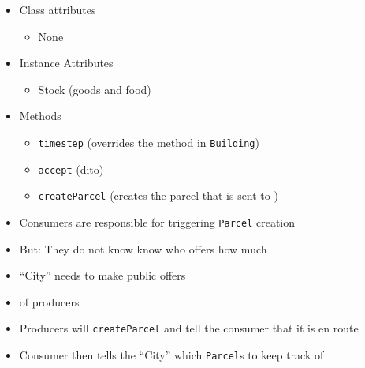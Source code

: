
\begin{frame}
%
\begin{tcbraster}[raster columns=2,
                  raster equal height,
                  nobeforeafter,
                  raster column skip=0.5cm]
\begin{tcolorbox}[title=Class \texttt{Supermarket}]
\begin{itemize}
\item Class attributes
	\begin{itemize}
	\item None
	\end{itemize}
\item Instance Attributes
	\begin{itemize}
	\item Stock (goods and food)
	\end{itemize}
\item Methods
	\begin{itemize}
	\item \texttt{timestep} (overrides the method in \texttt{Building})
	\item \texttt{accept} (dito)
	\item \texttt{createParcel} (creates the parcel that is sent to )
	\end{itemize}
\end{itemize}
\end{tcolorbox}
%
\begin{tcolorbox}[title=Why do we need \texttt{createParcel}?]
\begin{itemize}
\item Consumers are responsible for triggering \texttt{Parcel} creation
\item But: They do not know know who offers how much
\item \enquote{City} needs to make public offers
\item[\Thus]  of producers
\item Producers will \texttt{createParcel} and tell the consumer that it is en route
\item Consumer then tells the \enquote{City} which \texttt{Parcel}s to keep track of
\end{itemize}
\end{tcolorbox}
\end{tcbraster}
%
\end{frame}



